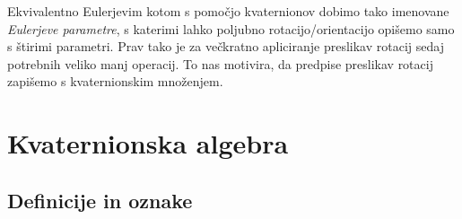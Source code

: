 \documentclass[a4paper,12pt]{article}
\begin{document}
Ekvivalentno Eulerjevim kotom s pomočjo kvaternionov dobimo tako imenovane \emph{Eulerjeve parametre}, s katerimi
lahko poljubno rotacijo/orientacijo opišemo samo s štirimi parametri. Prav tako je za večkratno apliciranje preslikav rotacij sedaj
potrebnih veliko manj operacij. To nas motivira, da predpise preslikav rotacij zapišemo s kvaternionskim množenjem.
\newpage


\section{Kvaternionska algebra}
\subsection{Definicije in oznake}
\end{document}
